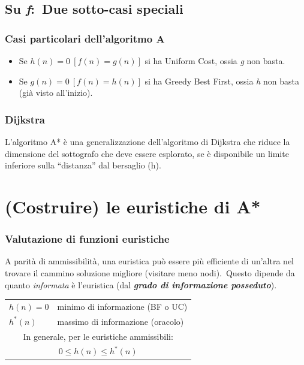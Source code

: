 \subsection{Su \textit{f}:\ Due sotto-casi speciali}

\subsubsection{Casi particolari dell'algoritmo A}
\begin{itemize}
	\item Se $h(n) = 0\ [f(n) = g(n)]$ si ha Uniform Cost, ossia \textit{g} non basta.
	\item Se $g(n) = 0\ [f(n) = h(n)]$ si ha Greedy Best First, ossia \textit{h} non basta (già visto all'inizio).
\end{itemize}

\subsubsection{Dijkstra}
L'algoritmo A* è una generalizzazione dell'algoritmo di Dijkstra che riduce la dimensione del sottografo che deve essere esplorato, se è disponibile un limite inferiore sulla ``distanza'' dal bersaglio (h).

\newpage

\section{(Costruire) le euristiche di A*}

\subsubsection{Valutazione di funzioni euristiche}

A parità di ammissibilità, una euristica può essere più efficiente di un'altra nel trovare il cammino soluzione migliore (visitare meno nodi).\
Questo dipende da quanto \textit{informata} è l'euristica (dal \textbf{\textit{grado di informazione posseduto}}).
\begin{table}[H]
	\centering
	\begin{tabular}{l l}
		$h(n)=0$ & minimo di informazione (BF o UC)                     \\
		$h^*(n)$ & massimo di informazione (oracolo)                    \\
		\multicolumn{2}{c}{In generale, per le euristiche ammissibili:} \\
		\multicolumn{2}{c}{$0 \leq h(n) \leq h^*(n)$}                   \\
	\end{tabular}
\end{table}

